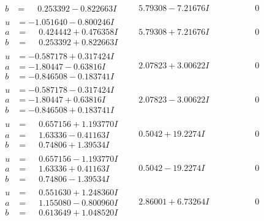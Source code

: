 \documentclass[1p]{elsarticle_modified}
\theoremstyle{definition}
\begin{document}
$$\begin{array}{c|c|c}
\begin{aligned}
b &= \phantom{-}0.253392 - 0.822663 I\end{aligned}
 & \phantom{-}5.79308 - 7.21676 I & \phantom{-0.000000 } 0 \\ \hline\begin{aligned}
u &= -1.051640 - 0.800246 I \\
a &= \phantom{-}0.424442 + 0.476358 I \\
b &= \phantom{-}0.253392 + 0.822663 I\end{aligned}
 & \phantom{-}5.79308 + 7.21676 I & \phantom{-0.000000 } 0 \\ \hline\begin{aligned}
u &= -0.587178 + 0.317424 I \\
a &= -1.80447 - 0.63816 I \\
b &= -0.846508 - 0.183741 I\end{aligned}
 & \phantom{-}2.07823 + 3.00622 I & \phantom{-0.000000 } 0 \\ \hline\begin{aligned}
u &= -0.587178 - 0.317424 I \\
a &= -1.80447 + 0.63816 I \\
b &= -0.846508 + 0.183741 I\end{aligned}
 & \phantom{-}2.07823 - 3.00622 I & \phantom{-0.000000 } 0 \\ \hline\begin{aligned}
u &= \phantom{-}0.657156 + 1.193770 I \\
a &= \phantom{-}1.63336 - 0.41163 I \\
b &= \phantom{-}0.74806 + 1.39534 I\end{aligned}
 & \phantom{-}0.5042 + 19.2274 I & \phantom{-0.000000 } 0 \\ \hline\begin{aligned}
u &= \phantom{-}0.657156 - 1.193770 I \\
a &= \phantom{-}1.63336 + 0.41163 I \\
b &= \phantom{-}0.74806 - 1.39534 I\end{aligned}
 & \phantom{-}0.5042 - 19.2274 I & \phantom{-0.000000 } 0 \\ \hline\begin{aligned}
u &= \phantom{-}0.551630 + 1.248360 I \\
a &= \phantom{-}1.155080 - 0.800960 I \\
b &= \phantom{-}0.613649 + 1.048520 I\end{aligned}
 & \phantom{-}2.86001 + 6.73264 I & \phantom{-0.000000 } 0 \\ \hline\begin{aligned}

\end{aligned}
\end{array}$$
\end{document}
